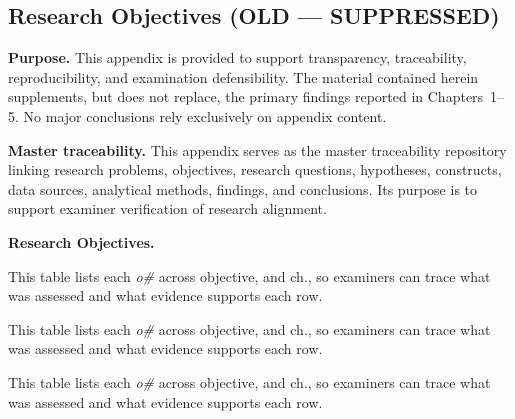 \subsection{Research Objectives (OLD — SUPPRESSED)}


\noindent\textbf{Purpose.} This appendix is provided to support transparency, traceability, reproducibility, and examination defensibility. The material contained herein supplements, but does not replace, the primary findings reported in Chapters~1--5. No major conclusions rely exclusively on appendix content.


\noindent\textbf{Master traceability.} This appendix serves as the master traceability repository linking research problems, objectives, research questions, hypotheses, constructs, data sources, analytical methods, findings, and conclusions. Its purpose is to support examiner verification of research alignment.


\noindent\textbf{Research Objectives.}


\noindent This table lists each \textit{o\#} across objective, and ch., so examiners can trace what was assessed and what evidence supports each row.



\noindent This table lists each \textit{o\#} across objective, and ch., so examiners can trace what was assessed and what evidence supports each row.


\noindent This table lists each \textit{o\#} across objective, and ch., so examiners can trace what was assessed and what evidence supports each row.



